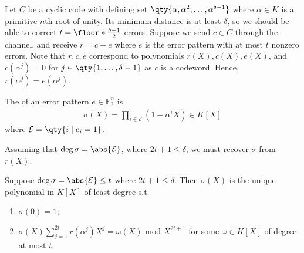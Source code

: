 Let $C$ be a cyclic code with defining set $\qty{\alpha, \alpha^2, \dots, \alpha^{\delta - 1}}$ where $\alpha \in K$ is a primitive $n$th root of unity.
Its minimum distance is at least $\delta$, so we should be able to correct $t = \floor*{\frac{\delta - 1}{2}}$ errors.
Suppose we send $c \in C$ through the channel, and receive $r = c + e$ where $e$ is the error pattern with at most $t$ nonzero errors.
Note that $r, c, e$ correspond to polynomials $r(X), c(X), e(X)$, and $c(\alpha^j) = 0$ for $j \in \qty{1, \dots, \delta - 1}$ as $c$ is a codeword.
Hence, $r(\alpha^j) = e(\alpha^j)$.
\begin{definition}
    The  of an error pattern $e \in \mathbb F_2^n$ is
    \begin{align*}
        \sigma(X) = \prod_{i \in \mathcal E} (1 - \alpha^i X) \in K[X]
    \end{align*}
    where $\mathcal E = \qty{i \mid e_i = 1}$.
\end{definition}
Assuming that $\deg \sigma = \abs{\mathcal E}$, where $2t + 1 \leq \delta$, we must recover $\sigma$ from $r(X)$.
\begin{theorem}
    Suppose $\deg \sigma = \abs{\mathcal E} \leq t$ where $2t + 1 \leq \delta$.
    Then $\sigma(X)$ is the unique polynomial in $K[X]$ of least degree s.t.
    \begin{enumerate}
        \item $\sigma(0) = 1$;
        \item $\sigma(X) \sum_{j=1}^{2t} r(\alpha^j) X^j = \omega(X)$ mod $X^{2t+1}$ for some $\omega \in K[X]$ of degree at most $t$.
    \end{enumerate}
\end{theorem}
